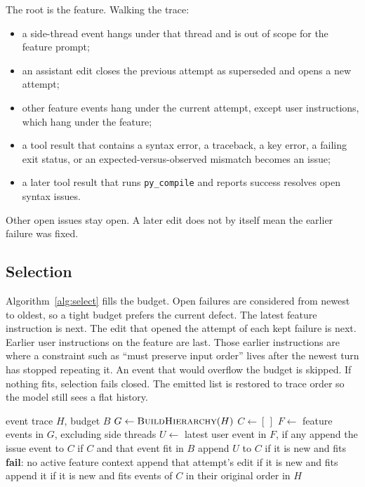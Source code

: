 \documentclass[11pt]{article}
\begin{document}
The root is the feature.
Walking the trace:
\begin{itemize}
  \item a side-thread event hangs under that thread and is out of scope for the feature prompt;
  \item an assistant edit closes the previous attempt as superseded and opens a new attempt;
  \item other feature events hang under the current attempt, except user instructions, which hang under the feature;
  \item a tool result that contains a syntax error, a traceback, a key error, a failing exit status, or an expected-versus-observed mismatch becomes an issue;
  \item a later tool result that runs \texttt{py\_compile} and reports success resolves open syntax issues.
\end{itemize}
Other open issues stay open.
A later edit does not by itself mean the earlier failure was fixed.

\subsection{Selection}

Algorithm~\ref{alg:select} fills the budget.
Open failures are considered from newest to oldest, so a tight budget prefers the current defect.
The latest feature instruction is next.
The edit that opened the attempt of each kept failure is next.
Earlier user instructions on the feature are last.
Those earlier instructions are where a constraint such as ``must preserve input order'' lives after the newest turn has stopped repeating it.
An event that would overflow the budget is skipped.
If nothing fits, selection fails closed.
The emitted list is restored to trace order so the model still sees a flat history.

\begin{algorithm}[H]
\caption{Feature-attempt context selection}
\label{alg:select}
\begin{algorithmic}[1]
\Require event trace $H$, budget $B$
\State $G \gets \textsc{BuildHierarchy}(H)$
\State $C \gets [\,]$
\State $F \gets$ feature events in $G$, excluding side threads
\State $U \gets$ latest user event in $F$, if any
  \State append the issue event to $C$ if $C$ and that event fit in $B$
\EndFor
\State append $U$ to $C$ if it is new and fits
  \State \textbf{fail}: no active feature context
\EndIf
{}
  \State append that attempt's edit if it is new and fits
\EndFor
{}
  \State append it if it is new and fits
\EndFor
\State \Return events of $C$ in their original order in $H$
\end{algorithmic}
\end{algorithm}
\end{document}
